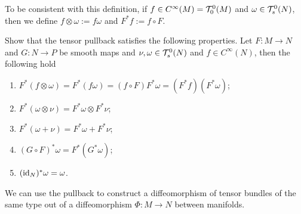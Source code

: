 To be consistent with this definition, if $f\in C^\infty(M) = \mathcal{T}_0^0(M)$ and $\omega \in\mathcal{T}_s^0(N)$, then we define $f\otimes \omega := f\omega$ and $F^* f := f\circ F$.

\begin{exercise}
  Show that the tensor pullback satisfies the following properties.
  Let $F:M\to N$ and $G:N\to P$ be smooth maps and $\nu, \omega \in\mathcal{T}_s^0(N)$ and $f\in C^\infty(N)$, then the following hold
  \begin{enumerate}
    \item $F^*(f\otimes\omega) = F^*(f \omega) = (f\circ F) F^*\omega = (F^* f)(F^*\omega)$;
    \item $F^*(\omega\otimes\nu) = F^*\omega\otimes F^*\nu$;
    \item $F^*(\omega + \nu) = F^*\omega + F^*\nu$;
    \item $(G\circ F)^*\omega = F^*(G^* \omega)$;
    \item $(\operatorname{id}_N)^* \omega = \omega$.
  \end{enumerate}
\end{exercise}

We can use the pullback to construct a diffeomorphism of tensor bundles of the same type out of a diffeomorphism $\Phi:M\to N$ between manifolds.

